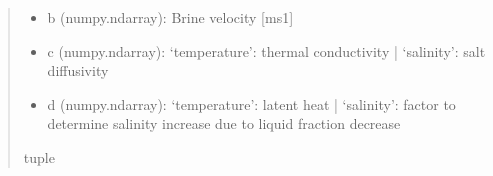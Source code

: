 \documentclass[a4paper,11pt,english,openany]{sphinxmanual}
\begin{document}
\begin{fulllineitems}
\begin{quote}
\begin{description}
\begin{description}
\begin{itemize}
\item {} 
\sphinxAtStartPar
b (numpy.ndarray): Brine velocity {[}ms\sphinxhyphen{}1{]}

\item {} 
\sphinxAtStartPar
c (numpy.ndarray): ‘temperature’: thermal conductivity | ‘salinity’: salt diffusivity

\item {} 
\sphinxAtStartPar
d (numpy.ndarray): ‘temperature’: latent heat | ‘salinity’: factor to determine salinity increase due to liquid fraction decrease

\end{itemize}

\end{description}


\sphinxAtStartPar
tuple

\end{description}\end{quote}

\end{fulllineitems}


\sphinxstepscope
{}\label{\detokenize{api/spyice.main_process:module-spyice.main_process}}
\end{document}
